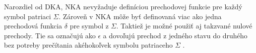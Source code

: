 Narozdiel od DKA, NKA nevyžaduje definíciou prechodovej funkcie pre každý symbol 
patriaci $\Sigma$. Zároveň v NKA môže byť definovaná viac ako jedna prechodová funkcia $\delta$ pre symbol z $\Sigma$. Taktiež je možné použiť aj takzvané nulové prechody. Tie sa označujú ako $\epsilon$ a dovoľujú prechod z jedného stavu do druhého bez potreby prečítania akéhokoľvek symbolu patriaceho $\Sigma$ \cite{FiniteStateMachines}.